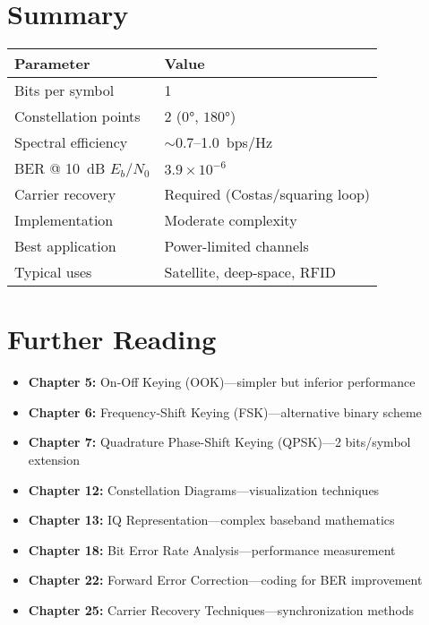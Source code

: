 \section{Summary}

\begin{center}
\begin{tabular}{@{}ll@{}}
\toprule
\textbf{Parameter} & \textbf{Value} \\
\midrule
Bits per symbol & 1 \\
Constellation points & 2 ($0°$, $180°$) \\
Spectral efficiency & $\sim$0.7--1.0~bps/Hz \\
BER @ 10~dB $E_b/N_0$ & $3.9 \times 10^{-6}$ \\
Carrier recovery & Required (Costas/squaring loop) \\
Implementation & Moderate complexity \\
Best application & Power-limited channels \\
Typical uses & Satellite, deep-space, RFID \\
\bottomrule
\end{tabular}
\end{center}

\section{Further Reading}

\begin{itemize}
\item \textbf{Chapter 5:} On-Off Keying (OOK)---simpler but inferior performance
\item \textbf{Chapter 6:} Frequency-Shift Keying (FSK)---alternative binary scheme
\item \textbf{Chapter 7:} Quadrature Phase-Shift Keying (QPSK)---2 bits/symbol extension
\item \textbf{Chapter 12:} Constellation Diagrams---visualization techniques
\item \textbf{Chapter 13:} IQ Representation---complex baseband mathematics
\item \textbf{Chapter 18:} Bit Error Rate Analysis---performance measurement
\item \textbf{Chapter 22:} Forward Error Correction---coding for BER improvement
\item \textbf{Chapter 25:} Carrier Recovery Techniques---synchronization methods
\end{itemize}
